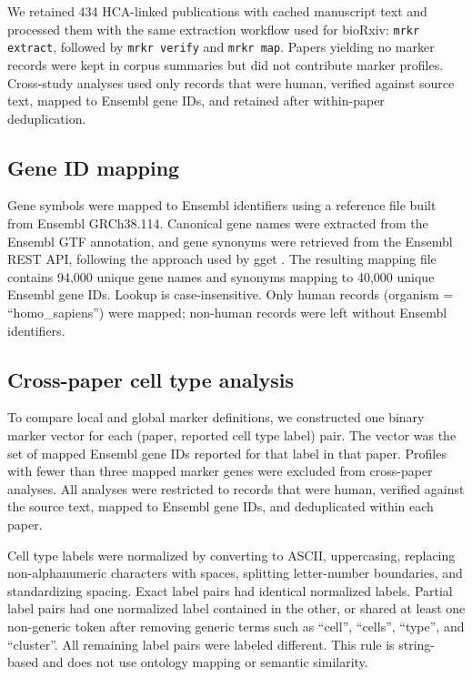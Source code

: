 \documentclass[10pt,twocolumn]{article}
\theoremstyle{plain}
\theoremstyle{definition}
\theoremstyle{remark}
\begin{document}
We retained 434 HCA-linked publications with cached manuscript text and processed them with the same extraction workflow used for bioRxiv: \texttt{mrkr extract}, followed by \texttt{mrkr verify} and \texttt{mrkr map}. Papers yielding no marker records were kept in corpus summaries but did not contribute marker profiles. Cross-study analyses used only records that were human, verified against source text, mapped to Ensembl gene IDs, and retained after within-paper deduplication.

\subsection{Gene ID mapping}

Gene symbols were mapped to Ensembl identifiers using a reference file built from Ensembl GRCh38.114. Canonical gene names were extracted from the Ensembl GTF annotation, and gene synonyms were retrieved from the Ensembl REST API, following the approach used by gget \citep{Luebbert2023}. The resulting mapping file contains 94{,}000 unique gene names and synonyms mapping to 40{,}000 unique Ensembl gene IDs. Lookup is case-insensitive. Only human records (organism = ``homo\_sapiens'') were mapped; non-human records were left without Ensembl identifiers.

\subsection{Cross-paper cell type analysis}

To compare local and global marker definitions, we constructed one binary marker vector for each (paper, reported cell type label) pair. The vector was the set of mapped Ensembl gene IDs reported for that label in that paper. Profiles with fewer than three mapped marker genes were excluded from cross-paper analyses. All analyses were restricted to records that were human, verified against the source text, mapped to Ensembl gene IDs, and deduplicated within each paper.

Cell type labels were normalized by converting to ASCII, uppercasing, replacing non-alphanumeric characters with spaces, splitting letter-number boundaries, and standardizing spacing. Exact label pairs had identical normalized labels. Partial label pairs had one normalized label contained in the other, or shared at least one non-generic token after removing generic terms such as ``cell'', ``cells'', ``type'', and ``cluster''. All remaining label pairs were labeled different. This rule is string-based and does not use ontology mapping or semantic similarity.
\end{document}
